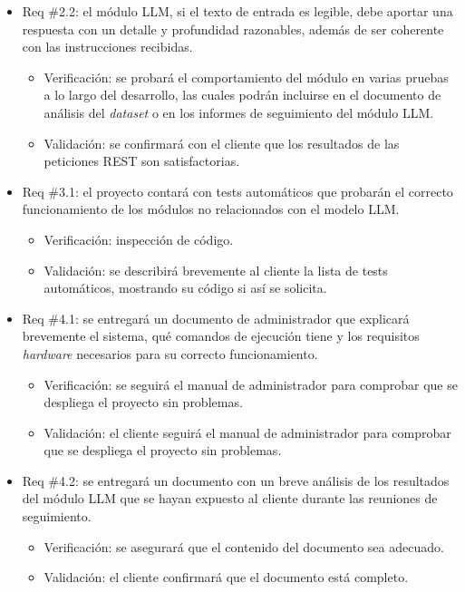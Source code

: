 \documentclass[
11pt, %
]{Clases/charter}
\begin{document}
\begin{itemize}
	\item Req \#2.2: el módulo LLM, si el texto de entrada es legible, debe aportar una respuesta con un detalle y profundidad razonables,
	      además de ser coherente con las instrucciones recibidas.
	      \begin{itemize}
		      \item Verificación: se probará el comportamiento del módulo en varias pruebas a lo largo del desarrollo,
		            las cuales podrán incluirse en el documento de análisis del \textit{dataset} o en los informes de seguimiento del módulo LLM.
		      \item Validación: se confirmará con el cliente que los resultados de las peticiones REST son satisfactorias.
	      \end{itemize}

	\item Req \#3.1: el proyecto contará con tests automáticos que probarán el correcto funcionamiento de los módulos no relacionados con el modelo LLM.
	      \begin{itemize}
		      \item Verificación: inspección de código.
		      \item Validación: se describirá brevemente al cliente la lista de tests automáticos, mostrando su código si así se solicita.
	      \end{itemize}

	\item Req \#4.1: se entregará un documento de administrador que explicará brevemente el sistema, qué comandos de ejecución tiene y los requisitos \textit{hardware} necesarios para su correcto funcionamiento.
	      \begin{itemize}
		      \item Verificación: se seguirá el manual de administrador para comprobar que se despliega el proyecto sin problemas.
		      \item Validación: el cliente seguirá el manual de administrador para comprobar que se despliega el proyecto sin problemas.
	      \end{itemize}

	\item Req \#4.2: se entregará un documento con un breve análisis de los resultados del módulo LLM que se hayan expuesto al cliente durante las reuniones de seguimiento.
	      \begin{itemize}
		      \item Verificación: se asegurará que el contenido del documento sea adecuado.
		      \item Validación: el cliente confirmará que el documento está completo.
	      \end{itemize}


\end{itemize}
\end{document}
